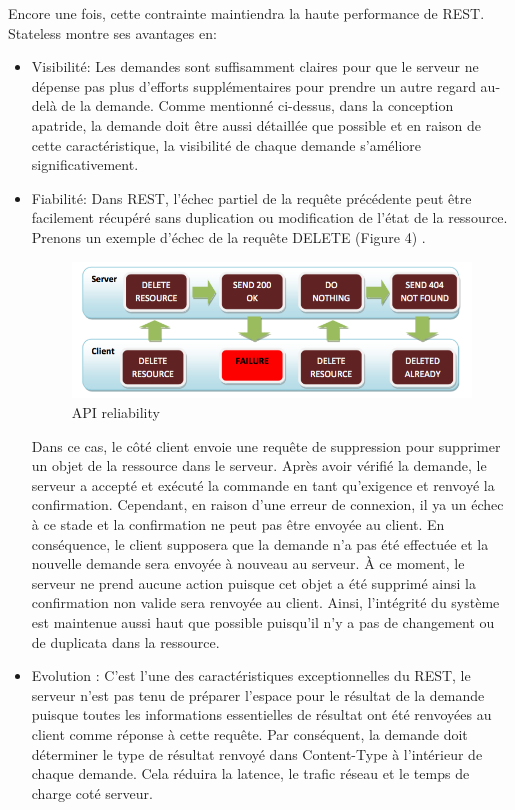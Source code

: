 Encore une fois, cette contrainte maintiendra la haute performance de REST. Stateless montre ses avantages en:
\begin{itemize}
\item Visibilité: Les demandes sont suffisamment claires pour que le serveur ne dépense pas plus d'efforts supplémentaires pour prendre un autre regard au-delà de la demande. Comme mentionné ci-dessus, dans la conception apatride, la demande doit être aussi détaillée que possible et en raison de cette caractéristique, la visibilité de chaque demande s'améliore significativement.
\item Fiabilité: Dans REST, l'échec partiel de la requête précédente peut être facilement récupéré sans duplication ou modification de l'état de la ressource. Prenons un exemple d'échec de la requête DELETE (Figure 4) \cite{6}.
\begin{figure}[! ht ]
			\centering
			\includegraphics[scale=.4]{./images/api_reliability.png}
			\caption {API reliability}
		\end{figure}
Dans ce cas, le côté client envoie une requête de suppression pour supprimer un objet de la ressource dans le serveur. Après avoir vérifié la demande, le serveur a accepté et exécuté la commande en tant qu'exigence et renvoyé la confirmation. Cependant, en raison d'une erreur de connexion, il ya un échec à ce stade et la confirmation ne peut pas être envoyée au client. En conséquence, le client supposera que la demande n'a pas été effectuée et la nouvelle demande sera envoyée à nouveau au serveur. À ce moment, le serveur ne prend aucune action puisque cet objet a été supprimé ainsi la confirmation non valide sera renvoyée au client. Ainsi, l'intégrité du système est maintenue aussi haut que possible puisqu'il n'y a pas de changement ou de duplicata dans la ressource.

\item Evolution : C'est l'une des caractéristiques exceptionnelles du REST, le serveur n'est pas tenu de préparer l'espace pour le résultat de la demande puisque toutes les informations essentielles de résultat ont été renvoyées au client comme réponse à cette requête. Par conséquent, la demande doit déterminer le type de résultat renvoyé dans Content-Type à l'intérieur de chaque demande. Cela réduira la latence, le trafic réseau et le temps de charge coté serveur.
\end{itemize}

